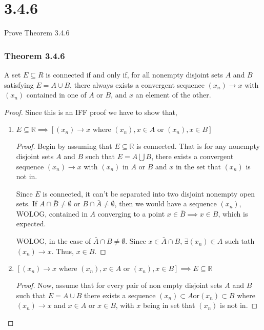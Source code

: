\documentclass{article}
\begin{document}
\section*{3.4.6}
Prove Theorem 3.4.6
\subsubsection*{\textbf{Theorem 3.4.6}}
A set $E \subseteq R$ is connected if and only if, for all nonempty
disjoint sets $A$ and $B$ satisfying $E = A \cup B$, there always 
exists a convergent sequence $(x_n) \rightarrow x$ with $(x_n)$ 
contained in one of $A$ or $B$, and $x$ an element of the other.

\begin{proof}
Since this is an IFF proof we have to show that,
\begin{enumerate}
\item $E \subseteq \mathbb{R} \implies [(x_n) \rightarrow x  
\text{ where } (x_n),x \in A \text{ or } (x_n),x \in B]$

\begin{proof}
  Begin by assuming that $E \subseteq \mathbb{R}$ is connected. That is for any 
  nonempty disjoint sets $A$ and $B$ such that $E = A \bigcup B$, there exists a 
  convergent sequence $(x_n) \rightarrow x$ with $(x_n)$ in $A$ or $B$ and $x$ in 
  the set that $(x_n)$ is not in.
  
  Since $E$ is connected, it can't be separated into two disjoint nonempty open sets. If 
  $A \cap \bar{B} \ne \emptyset$ or $B \cap \bar{A} \ne \emptyset$, then we 
  would have a sequence $(x_n)$, WOLOG, contained in $A$ converging to a point $x \in \bar{B} 
  \implies x \in B$, which is expected.

  WOLOG, in the case of $\bar{A} \cap B \ne \emptyset$. Since $x \in \bar{A} \cap B$, $\exists (x_n) 
  \in A$ such tath $(x_n) \rightarrow x$. Thus, $x \in B$.
\end{proof}


\item $[(x_n) \rightarrow x \text{ where } (x_n),x \in A 
\text{ or } (x_n),x \in B] \implies  E \subseteq \mathbb{R}$
\begin{proof}

Now, assume that for every pair of non empty disjoint sets $A$ and $B$ such that 
$E = A \cup B$ there exists a sequence $(x_n) \subset A \text{or} (x_n) \subset B$ where 
$(x_n) \rightarrow x$ and $x \in A$ or $x \in B$, with $x$ being in set that $(x_n)$ is not in.


\end{proof}
\end{enumerate}
\end{proof}
\end{document}
